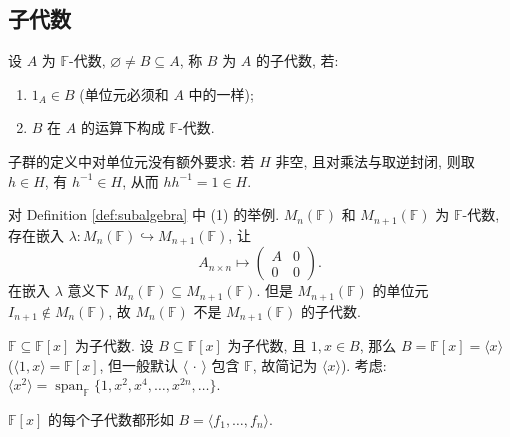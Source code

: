 \subsection{子代数}

\begin{definition}[子代数]\label{def:subalgebra}
设 $A$ 为 $\mathbb{F}$-代数, $\varnothing\neq B\subseteq A$, 称 $B$ 为 $A$ 的子代数, 若:
\begin{enumerate}
  \item $1_A\in B$ (单位元必须和 $A$ 中的一样);
  \item $B$ 在 $A$ 的运算下构成 $\mathbb{F}$-代数.
\end{enumerate}
\end{definition}

\begin{remark}\label{rem:unit-in-group}
子群的定义中对单位元没有额外要求: 若 $H$ 非空, 且对乘法与取逆封闭,
则取 $h\in H$, 有 $h^{-1}\in H$, 从而 $hh^{-1}=1\in H$.
\end{remark}

\begin{remark}\label{rem:unit-mismatch}
对 Definition \ref{def:subalgebra} 中 (1) 的举例.
$M_n(\mathbb{F})$ 和 $M_{n+1}(\mathbb{F})$ 为 $\mathbb{F}$-代数, 存在嵌入
$\lambda\colon M_n(\mathbb{F})\hookrightarrow M_{n+1}(\mathbb{F})$,
让
\[
  A_{n\times n}\longmapsto \begin{pmatrix}A&0\\0&0\end{pmatrix}.
\]
在嵌入 $\lambda$ 意义下 $M_n(\mathbb{F})\subseteq M_{n+1}(\mathbb{F})$. 但是 $M_{n+1}(\mathbb{F})$ 的单位元
$I_{n+1}\notin M_n(\mathbb{F})$, 故 $M_n(\mathbb{F})$ 不是 $M_{n+1}(\mathbb{F})$ 的子代数.
\end{remark}

\begin{example}\label{ex:poly-subalgebra}
$\mathbb{F}\subseteq \mathbb{F}[x]$ 为子代数.
  设 $B\subseteq \mathbb{F}[x]$ 为子代数, 且 $1,x\in B$, 那么 $B=\mathbb{F}[x]=\langle x\rangle$
  ($\langle 1,x\rangle=\mathbb{F}[x]$, 但一般默认 $\langle\,\cdot\,\rangle$ 包含 $\mathbb{F}$, 故简记为 $\langle x\rangle$).
  考虑: $\langle x^2\rangle=\operatorname{span}_{\mathbb{F}}\{1,x^2,x^4,\dots,x^{2n},\dots\}$.
\end{example}

\begin{proposition}\label{prop:fx-subalgebra-fg}
$\mathbb{F}[x]$ 的每个子代数都形如 $B=\langle f_1,\dots,f_n\rangle$.
\end{proposition}

